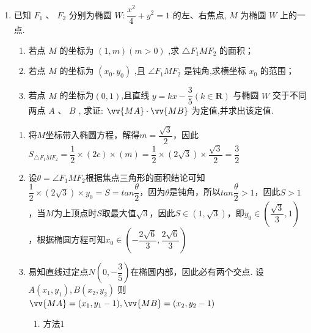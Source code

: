 \begin{enumerate}
\begin{jieda}
\begin{enumerate}
\begin{enumerate}
\begin{dingautolist}{172}
                    $\vv{OA} \cdot  \vv{OB} = {x}_{1}{x}_{2} + {y}_{1}{y}_{2} = {x}_{1}{x}_{2} - \dfrac{1}{3}{x}_{1}{x}_{2} = \dfrac{2}{3}{x}_{1}{x}_{2} = \dfrac{2}{3} \cdot  \dfrac{3{t}^{2} - 9}{1 + 3{k}^{2}} = 3 \cdot  \dfrac{{t}^{2} - 3}{{t}^{2}} = 3\left( {1 - \dfrac{3}{{t}^{2}}}\right) \in  \lbrack  - 3,0) \cup  \left( {0,3}\right)$ .
                \end{dingautolist}
                综上, $\vv{OA} \cdot  \vv{OB}$ 的取值范围为 $\left\lbrack  {-3,0)\cup (0,3}\right\rbrack$ .
            \end{enumerate}
        \end{enumerate}
    \end{jieda}
    \item 已知 ${F}_{1}$ 、 ${F}_{2}$ 分别为椭圆 $W : \dfrac{{x}^{2}}{4} + {y}^{2} = 1$ 的左、右焦点, $M$ 为椭圆 $W$ 上的一点.
    \begin{enumerate}
        \item 若点 $M$ 的坐标为 $\left( {1,m}\right) \left( {m > 0}\right)$ ,求 $\bigtriangleup {F}_{1}M{F}_{2}$ 的面积；
        \item 若点 $M$ 的坐标为 $\left( {{x}_{0},{y}_{0}}\right)$ ,且 $\angle {F}_{1}M{F}_{2}$ 是钝角,求横坐标 ${x}_{0}$ 的范围；
        \item 若点 $M$ 的坐标为$(0,1)$,且直线 $y = {kx} - \dfrac{3}{5}\left( {k \in  \mathbf{R}}\right)$ 与椭圆 $W$ 交于不同两点 $A\text{ 、 }B$ , 求证: $\vv{MA} \cdot  \vv{MB}$ 为定值,并求出该定值.
    \end{enumerate}
    \begin{jieda}
        \begin{enumerate}
            \item 将$M$坐标带入椭圆方程，解得$m = \dfrac{\sqrt{3}}{2}$，因此$S_{\bigtriangleup {F}_{1}M{F}_{2}} = \dfrac{1}{2} \times (2c) \times (m) = \dfrac{1}{2} \times (2\sqrt{3}) \times \dfrac{\sqrt{3}}{2} = \dfrac{3}{2}$
            \item 设$\theta = \angle{F_1MF_2}$根据焦点三角形的面积结论可知$\dfrac{1}{2} \times (2\sqrt{3}) \times y_0 = S = tan\dfrac{\theta}{2}$，因为$\theta$是钝角，所以$tan\dfrac{\theta}{2} > 1$，因此$S>1$，当$M$为上顶点时$S$取最大值$\sqrt{3}$，因此$S \in (1, \sqrt{3})$，即$y_0 \in \left(\dfrac{\sqrt{3}}{3}, 1\right)$，根据椭圆方程可知$x_0 \in \left(-\dfrac{2\sqrt{6}}{3}, \dfrac{2\sqrt{6}}{3}\right)$
            \item 易知直线过定点$N\left(0, -\dfrac{3}{5}\right)$在椭圆内部，因此必有两个交点. 设 $A\left( {{x}_{1},{y}_{1}}\right) ,B\left( {{x}_{2},{y}_{2}}\right)$ 则$\vv{MA} = (x_1, y_1-1), \vv{MB} = (x_2, y_2-1)$
            \begin{enumerate}
                \item 方法1
                

\end{enumerate}
\end{enumerate}
\end{jieda}
\end{enumerate}
